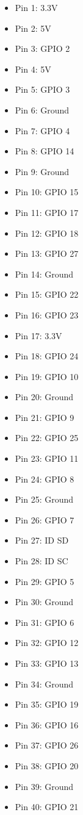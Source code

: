 \documentclass[11pt]{article}
\begin{document}
\begin{enumerate}
	      \begin{itemize}
		      \item Pin 1: 3.3V
		      \item Pin 2: 5V
		      \item Pin 3: GPIO 2
		      \item Pin 4: 5V
		      \item Pin 5: GPIO 3
		      \item Pin 6: Ground
		      \item Pin 7: GPIO 4
		      \item Pin 8: GPIO 14
		      \item Pin 9: Ground
		      \item Pin 10: GPIO 15
		      \item Pin 11: GPIO 17
		      \item Pin 12: GPIO 18
		      \item Pin 13: GPIO 27
		      \item Pin 14: Ground
		      \item Pin 15: GPIO 22
		      \item Pin 16: GPIO 23
		      \item Pin 17: 3.3V
		      \item Pin 18: GPIO 24
		      \item Pin 19: GPIO 10
		      \item Pin 20: Ground
		      \item Pin 21: GPIO 9
		      \item Pin 22: GPIO 25
		      \item Pin 23: GPIO 11
		      \item Pin 24: GPIO 8
		      \item Pin 25: Ground
		      \item Pin 26: GPIO 7
		      \item Pin 27: ID SD
		      \item Pin 28: ID SC
		      \item Pin 29: GPIO 5
		      \item Pin 30: Ground
		      \item Pin 31: GPIO 6
		      \item Pin 32: GPIO 12
		      \item Pin 33: GPIO 13
		      \item Pin 34: Ground
		      \item Pin 35: GPIO 19
		      \item Pin 36: GPIO 16
		      \item Pin 37: GPIO 26
		      \item Pin 38: GPIO 20
		      \item Pin 39: Ground
		      \item Pin 40: GPIO 21
	      \end{itemize}
\end{enumerate}
\end{document}
